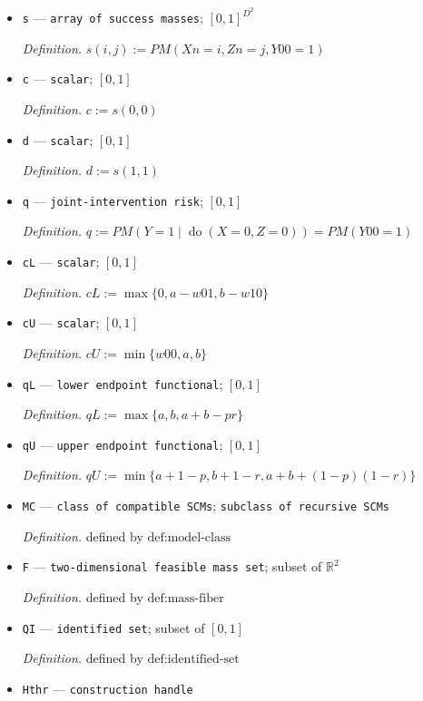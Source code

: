 \documentclass{article}
\begin{document}
\begin{itemize}
  \par\smallskip\noindent\emph{Definition.} \(Y00:=fY(0,0,U0,V0,W0)\)
  \item \texttt{s} --- \texttt{array of success masses}; \([0,1]^{D^2}\)
  \par\smallskip\noindent\emph{Definition.} \(s(i,j):=PM(Xn=i,Zn=j,Y00=1)\)
  \item \texttt{c} --- \texttt{scalar}; \([0,1]\)
  \par\smallskip\noindent\emph{Definition.} \(c:=s(0,0)\)
  \item \texttt{d} --- \texttt{scalar}; \([0,1]\)
  \par\smallskip\noindent\emph{Definition.} \(d:=s(1,1)\)
  \item \texttt{q} --- \texttt{joint-\allowbreak{}intervention risk}; \([0,1]\)
  \par\smallskip\noindent\emph{Definition.} \(q:=PM(Y=1\mid\operatorname{do}(X=0,Z=0))=PM(Y00=1)\)
  \item \texttt{cL} --- \texttt{scalar}; \([0,1]\)
  \par\smallskip\noindent\emph{Definition.} \(cL:=\max\{0,a-w01,b-w10\}\)
  \item \texttt{cU} --- \texttt{scalar}; \([0,1]\)
  \par\smallskip\noindent\emph{Definition.} \(cU:=\min\{w00,a,b\}\)
  \item \texttt{qL} --- \texttt{lower endpoint functional}; \([0,1]\)
  \par\smallskip\noindent\emph{Definition.} \(qL:=\max\{a,b,a+b-pr\}\)
  \item \texttt{qU} --- \texttt{upper endpoint functional}; \([0,1]\)
  \par\smallskip\noindent\emph{Definition.} \(qU:=\min\{a+1-p,b+1-r,a+b+(1-p)(1-r)\}\)
  \item \texttt{MC} --- \texttt{class of compatible SCMs}; \texttt{subclass of recursive SCMs}
  \par\smallskip\noindent\emph{Definition.} defined by \(\text{def:model-class}\)
  \item \texttt{F} --- \texttt{two-\allowbreak{}dimensional feasible mass set}; subset of \(\mathbb R^2\)
  \par\smallskip\noindent\emph{Definition.} defined by \(\text{def:mass-fiber}\)
  \item \texttt{QI} --- \texttt{identified set}; subset of \([0,1]\)
  \par\smallskip\noindent\emph{Definition.} defined by \(\text{def:identified-set}\)
  \item \texttt{Hthr} --- \texttt{construction handle}

\end{itemize}
\end{document}
